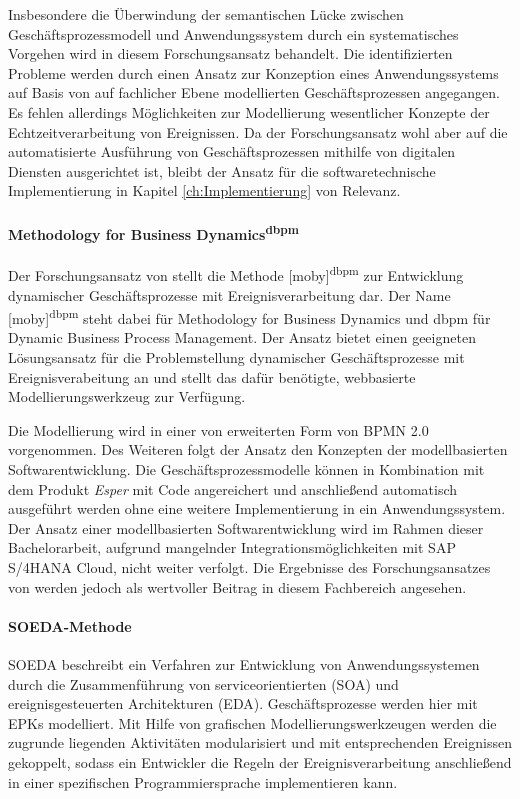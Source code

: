Insbesondere die Überwindung der semantischen Lücke zwischen Geschäftsprozessmodell und Anwendungssystem durch ein systematisches Vorgehen wird in diesem Forschungsansatz behandelt. Die identifizierten Probleme werden durch einen Ansatz zur Konzeption eines Anwendungssystems auf Basis von auf fachlicher Ebene modellierten Geschäftsprozessen angegangen.  
Es fehlen allerdings Möglichkeiten zur Modellierung wesentlicher Konzepte der Echtzeitverarbeitung von Ereignissen.
Da der Forschungsansatz wohl aber auf die automatisierte Ausführung von Geschäftsprozessen mithilfe von digitalen Diensten ausgerichtet ist, bleibt der Ansatz für die softwaretechnische Implementierung in Kapitel \ref{ch:Implementierung} von Relevanz. 

\paragraph{Methodology for Business Dynamics\textsuperscript{dbpm}}
Der Forschungsansatz von \citeauthor{Vidackovic.2014} stellt die  Methode [moby]\textsuperscript{dbpm} zur Entwicklung dynamischer Geschäftsprozesse mit Ereignisverarbeitung dar. Der Name [moby]\textsuperscript{dbpm} steht dabei für Methodology for Business Dynamics und dbpm für Dynamic Business Process Management. Der Ansatz bietet einen geeigneten Lösungsansatz für die Problemstellung dynamischer Geschäftsprozesse mit Ereignisverabeitung an und stellt das dafür benötigte, webbasierte Modellierungswerkzeug zur Verfügung. 
\cite{Vidackovic.2014}

Die Modellierung wird in einer von \citeauthor{Vidackovic.2014} erweiterten Form von \ac{BPMN} 2.0 vorgenommen. Des Weiteren folgt der Ansatz den Konzepten der modellbasierten Softwarentwicklung. Die Geschäftsprozessmodelle können in Kombination mit dem Produkt \textit{Esper} mit Code angereichert und anschließend automatisch ausgeführt werden ohne eine weitere Implementierung in ein Anwendungssystem. Der Ansatz einer modellbasierten Softwarentwicklung wird im Rahmen dieser Bachelorarbeit, aufgrund mangelnder Integrationsmöglichkeiten mit SAP S/4HANA Cloud, nicht weiter verfolgt. Die Ergebnisse des Forschungsansatzes von \citeauthor{Vidackovic.2014} werden jedoch als wertvoller Beitrag in diesem Fachbereich angesehen.  

\paragraph{SOEDA-Methode}
SOEDA beschreibt ein Verfahren zur Entwicklung von Anwendungssystemen durch die Zusammenführung von serviceorientierten (SOA) und ereignisgesteuerten Architekturen (EDA). Geschäftsprozesse werden hier mit \ac{EPK}s modelliert. 
\cite{MatthiasWieland.2009} 
Mit Hilfe von grafischen Modellierungswerkzeugen werden die zugrunde liegenden Aktivitäten modularisiert und mit entsprechenden Ereignissen gekoppelt, sodass ein Entwickler die Regeln der Ereignisverarbeitung anschließend in einer spezifischen Programmiersprache implementieren kann. 
\cite{Bruns.2010}

